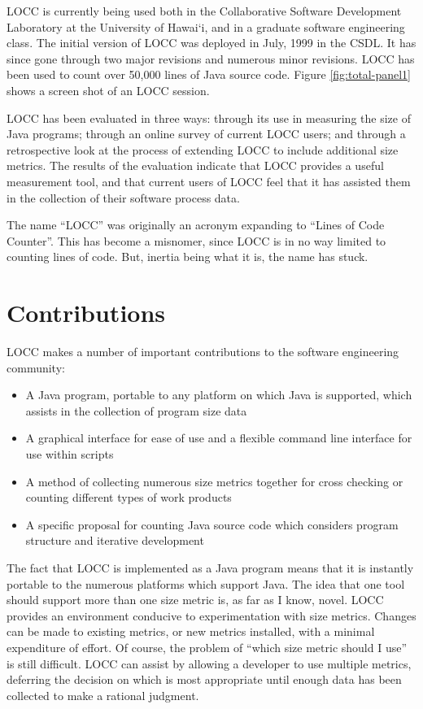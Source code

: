 LOCC is currently being used both in the Collaborative Software Development
Laboratory at the University of Hawai`i, and in a graduate software engineering
class.  The initial version of LOCC was deployed in July, 1999 in the CSDL.
It has since gone through two major revisions and numerous minor revisions.
LOCC has been used to count over 50,000 lines of
Java source code.  Figure \ref{fig:total-panel1} shows a screen shot of an LOCC
session.

LOCC has been evaluated in three ways: through its use in measuring
the size of Java programs; through an online survey of current LOCC
users; and through a retrospective look at the process of extending
LOCC to include additional size metrics.  The results of the evaluation
indicate that LOCC provides a useful measurement tool, and that current
users of LOCC feel that it has assisted them in the collection of their
software process data.

The name ``LOCC'' was originally an acronym expanding to ``Lines of
Code Counter''.  This has become a misnomer, since LOCC is in no way
limited to counting lines of code.  But, inertia being what it is,
the name has stuck. 

\section{Contributions}

LOCC makes a number of important contributions to the software engineering
community: 

\begin{itemize}
  \item A Java program, portable to any platform on which Java is
    supported, which assists in the collection of program size data
  \item A graphical interface for ease of use and a flexible command line
    interface for use within scripts
  \item A method of collecting numerous size metrics together for cross
    checking or counting different types of work products
  \item A specific proposal for counting Java source code which considers
    program structure and iterative development
\end{itemize}
    
The fact that LOCC is implemented as a Java program means that it is
instantly portable to the numerous platforms which support Java.  The idea
that one tool should support more than one size metric is, as far as I
know, novel.  LOCC provides an environment conducive to experimentation
with size metrics.  Changes can be made to existing metrics, or new metrics 
installed, with a minimal expenditure of effort.  Of course, the problem of 
``which size metric should I use'' is still difficult.  LOCC can assist by
allowing a developer to use multiple metrics, deferring the decision on
which is most appropriate until enough data has been collected to make a
rational judgment.


